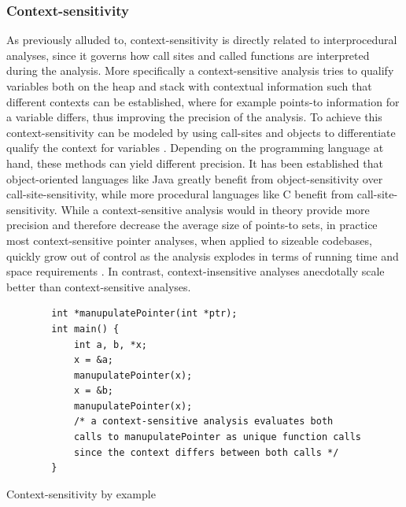 \subsubsection{Context-sensitivity}
As previously alluded to, context-sensitivity is directly related to interprocedural analyses, since it governs how call sites and called functions are interpreted during the analysis.
More specifically a context-sensitive analysis tries to qualify variables both on the heap and stack with contextual information such that different contexts can be established, where for example points-to information for a variable differs, thus improving the precision of the analysis.
To achieve this context-sensitivity can be modeled by using call-sites and objects to differentiate qualify the context for variables \cite{smaragdakis2015pointer}. Depending on the programming language at hand, these methods can yield different precision. It has been established that object-oriented languages like Java greatly benefit from object-sensitivity over call-site-sensitivity, while more procedural languages like C benefit from call-site-sensitivity.
While a context-sensitive analysis would in theory provide more precision and therefore decrease the average size of points-to sets, in practice most context-sensitive pointer analyses, when applied to sizeable codebases, quickly grow out of control as the analysis explodes in terms of running time and space requirements \cite{smaragdakis2014introspective}. In contrast, context-insensitive analyses anecdotally scale better than context-sensitive analyses.

\begin{listing}
    \begin{verbatim}
        int *manupulatePointer(int *ptr);
        int main() {
            int a, b, *x;
            x = &a;
            manupulatePointer(x);
            x = &b;
            manupulatePointer(x);
            /* a context-sensitive analysis evaluates both
            calls to manupulatePointer as unique function calls
            since the context differs between both calls */
        }
    \end{verbatim}
    \caption{Context-sensitivity by example}
    \label{lst:contextsens}
\end{listing}

